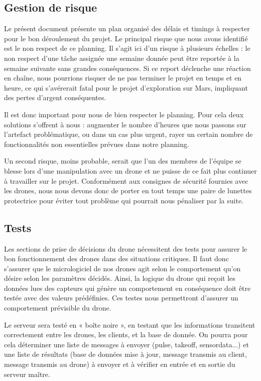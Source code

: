 \documentclass{mistcoursedoc}
\begin{document}
\subsection{Gestion de risque}

Le présent document présente un plan organisé des délais et timings à respecter pour le bon déroulement du projet. Le principal risque que nous avons identifié est le non respect de ce planning. Il s'agit ici d'un risque à plusieurs échelles : le non respect d'une tâche assignée une semaine donnée peut être reportée à la semaine suivante sans grandes conséquences. Si ce report déclenche une réaction en chaîne, nous pourrions risquer de ne pas terminer le projet en temps et en heure, ce qui s'avérerait fatal pour le projet d'exploration sur Mars, impliquant des pertes d'argent conséquentes.

Il est donc important pour nous de bien respecter le planning. Pour cela deux solutions s'offrent à nous : augmenter le nombre d'heures que nous passons sur l'artefact problématique, ou dans un cas plus urgent, rayer un certain nombre de fonctionnalités non essentielles prévues dans notre planning.

Un second risque, moins probable, serait que l'un des membres de l'équipe se blesse lors d'une manipulation avec un drone et ne puisse de ce fait plus continuer à travailler sur le projet. Conformément aux consignes de sécurité fournies avec les drones, nous nous devons donc de porter en tout temps une paire de lunettes protectrice pour éviter tout problème qui pourrait nous pénaliser par la suite.

\subsection{Tests}

Les sections de prise de décisions du drone nécessitent des tests pour assurer le bon fonctionnement des drones dans des situations critiques. Il faut donc s’assurer que le micrologiciel de nos drones agit selon le comportement qu’on désire selon les paramètres décidés. Ainsi, la logique du drone qui reçoit les données lues des capteurs qui génère un comportement en conséquence doit être testée avec des valeurs prédéfinies. Ces testes nous permettront d’assurer un comportement prévisible du drone.

Le serveur sera testé en « boîte noire », en testant que les informations transitent correctement entre les drones, les clients, et la base de donnée. On pourra pour cela déterminer une liste de messages à envoyer (pulse, takeoff, sensordata...) et une liste de résultats (base de données mise à jour, message transmis au client, message transmis au drone) à envoyer et à vérifier en entrée et en sortie du serveur maître.
\end{document}
